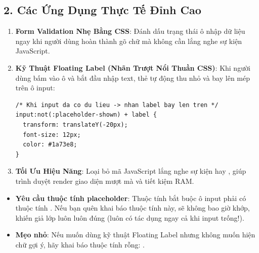 \subsection{2. Các Ứng Dụng Thực Tế Đỉnh Cao}

\begin{tipBox}
\begin{enumerate}[leftmargin=1.5em, itemsep=4pt, parsep=0pt]
    \item \textbf{Form Validation Nhẹ Bằng CSS}: Đánh dấu trạng thái ô nhập dữ liệu ngay khi người dùng hoàn thành gõ chữ mà không cần lắng nghe sự kiện JavaScript.
    \item \textbf{Kỹ Thuật Floating Label (Nhãn Trượt Nổi Thuần CSS)}: Khi người dùng bấm vào ô và bắt đầu nhập text, thẻ  tự động thu nhỏ và bay lên mép trên ô input:
    \begin{codeWindow}
\begin{lstlisting}[language=HTML5]
/* Khi input da co du lieu -> nhan label bay len tren */
input:not(:placeholder-shown) + label {
  transform: translateY(-20px);
  font-size: 12px;
  color: #1a73e8;
}
\end{lstlisting}
    \end{codeWindow}
    \item \textbf{Tối Ưu Hiệu Năng}: Loại bỏ mã JavaScript lắng nghe sự kiện  hay , giúp trình duyệt render giao diện mượt mà và tiết kiệm RAM.
\end{enumerate}
\end{tipBox}

\begin{warnBox}
\begin{itemize}[leftmargin=1.5em, itemsep=3pt, parsep=0pt]
    \item \textbf{Yêu cầu thuộc tính placeholder}: Thuộc tính  bắt buộc ô input phải có thuộc tính . Nếu bạn quên khai báo thuộc tính này,  sẽ không bao giờ khớp, khiến giả lớp  luôn luôn đúng (luôn có tác dụng ngay cả khi input trống!).
    \item \textbf{Mẹo nhỏ}: Nếu muốn dùng kỹ thuật Floating Label nhưng không muốn hiện chữ gợi ý, hãy khai báo thuộc tính rỗng: .
\end{itemize}
\end{warnBox}

